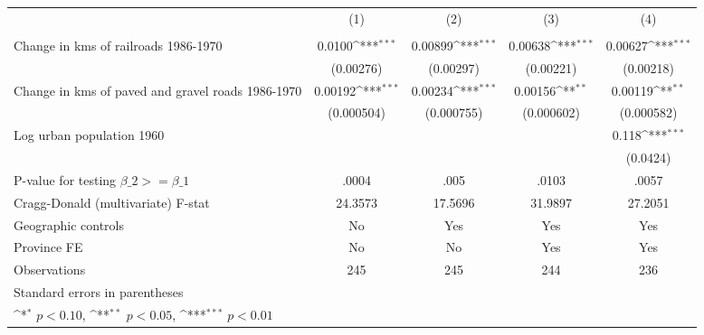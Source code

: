 {
\def\sym#1{\ifmmode^{#1}\else\(^{#1}\)\fi}
\begin{tabular}{l*{4}{c}}
\hline\hline
                &\multicolumn{1}{c}{(1)}&\multicolumn{1}{c}{(2)}&\multicolumn{1}{c}{(3)}&\multicolumn{1}{c}{(4)}\\
                &\multicolumn{1}{c}{}&\multicolumn{1}{c}{}&\multicolumn{1}{c}{}&\multicolumn{1}{c}{}\\
\hline
Change in kms of railroads 1986-1970&   0.0100\sym{***}&  0.00899\sym{***}&  0.00638\sym{***}&  0.00627\sym{***}\\
                &(0.00276)         &(0.00297)         &(0.00221)         &(0.00218)         \\
[1em]
Change in kms of paved and gravel roads 1986-1970&  0.00192\sym{***}&  0.00234\sym{***}&  0.00156\sym{**} &  0.00119\sym{**} \\
                &(0.000504)         &(0.000755)         &(0.000602)         &(0.000582)         \\
[1em]
Log urban population 1960&                  &                  &                  &    0.118\sym{***}\\
                &                  &                  &                  & (0.0424)         \\
\hline
P-value for testing $\beta\_{2} >= \beta\_{1}$&    .0004         &     .005         &    .0103         &    .0057         \\
Cragg-Donald (multivariate) F-stat&  24.3573         &  17.5696         &  31.9897         &  27.2051         \\
Geographic controls&       No         &      Yes         &      Yes         &      Yes         \\
Province FE     &       No         &       No         &      Yes         &      Yes         \\
Observations    &      245         &      245         &      244         &      236         \\
\hline\hline
\multicolumn{5}{l}{\footnotesize Standard errors in parentheses}\\
\multicolumn{5}{l}{\footnotesize \sym{*} \(p<0.10\), \sym{**} \(p<0.05\), \sym{***} \(p<0.01\)}\\
\end{tabular}
}
